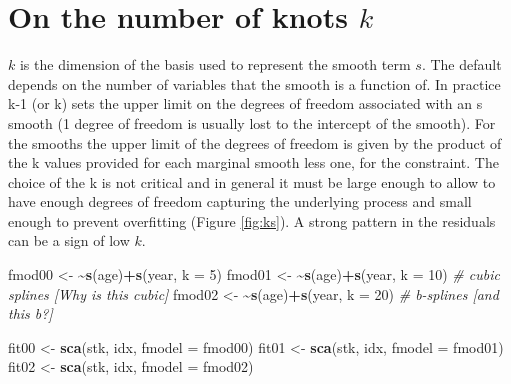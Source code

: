 \documentclass[
]{book}
\newenvironment{Shaded}{\begin{snugshade}}{\end{snugshade}}
\newcommand{\AttributeTok}[1]{\textcolor[rgb]{0.13,0.29,0.53}{#1}}
\newcommand{\CommentTok}[1]{\textcolor[rgb]{0.56,0.35,0.01}{\textit{#1}}}
\newcommand{\DecValTok}[1]{\textcolor[rgb]{0.00,0.00,0.81}{#1}}
\newcommand{\ErrorTok}[1]{\textcolor[rgb]{0.64,0.00,0.00}{\textbf{#1}}}
\newcommand{\FunctionTok}[1]{\textcolor[rgb]{0.13,0.29,0.53}{\textbf{#1}}}
\newcommand{\NormalTok}[1]{#1}
\newcommand{\OtherTok}[1]{\textcolor[rgb]{0.56,0.35,0.01}{#1}}
\newcommand{\SpecialCharTok}[1]{\textcolor[rgb]{0.81,0.36,0.00}{\textbf{#1}}}
\begin{document}
\hypertarget{on-the-number-of-knots-k}{%
\section{\texorpdfstring{On the number of knots \(k\)}{On the number of knots k}}\label{on-the-number-of-knots-k}}

\(k\) is the dimension of the basis used to represent the smooth term \(s\). The default depends on the number of variables that the smooth is a function of. In practice k-1 (or k) sets the upper limit on the degrees of freedom associated with an s smooth (1 degree of freedom is usually lost to the intercept of the smooth). For the smooths the upper limit of the degrees of freedom is given by the product of the k values provided for each marginal smooth less one, for the constraint. The choice of the k is not critical and in general it must be large enough to allow to have enough degrees of freedom capturing the underlying process and small enough to prevent overfitting (Figure \ref{fig:ks}). A strong pattern in the residuals can be a sign of low \(k\).

\begin{Shaded}
\begin{Highlighting}[]
\NormalTok{fmod00 }\OtherTok{\textless{}{-}} \ErrorTok{\textasciitilde{}}\FunctionTok{s}\NormalTok{(age)}\SpecialCharTok{+}\FunctionTok{s}\NormalTok{(year, }\AttributeTok{k =} \DecValTok{5}\NormalTok{)}
\NormalTok{fmod01 }\OtherTok{\textless{}{-}} \ErrorTok{\textasciitilde{}}\FunctionTok{s}\NormalTok{(age)}\SpecialCharTok{+}\FunctionTok{s}\NormalTok{(year, }\AttributeTok{k =} \DecValTok{10}\NormalTok{) }\CommentTok{\# cubic splines [Why is this cubic]}
\NormalTok{fmod02 }\OtherTok{\textless{}{-}} \ErrorTok{\textasciitilde{}}\FunctionTok{s}\NormalTok{(age)}\SpecialCharTok{+}\FunctionTok{s}\NormalTok{(year, }\AttributeTok{k =} \DecValTok{20}\NormalTok{) }\CommentTok{\# b{-}splines [and this b?]}

\NormalTok{fit00 }\OtherTok{\textless{}{-}} \FunctionTok{sca}\NormalTok{(stk, idx, }\AttributeTok{fmodel =}\NormalTok{ fmod00)}
\NormalTok{fit01 }\OtherTok{\textless{}{-}} \FunctionTok{sca}\NormalTok{(stk, idx, }\AttributeTok{fmodel =}\NormalTok{ fmod01)}
\NormalTok{fit02 }\OtherTok{\textless{}{-}} \FunctionTok{sca}\NormalTok{(stk, idx, }\AttributeTok{fmodel =}\NormalTok{ fmod02)}
\end{Highlighting}
\end{Shaded}
\end{document}
